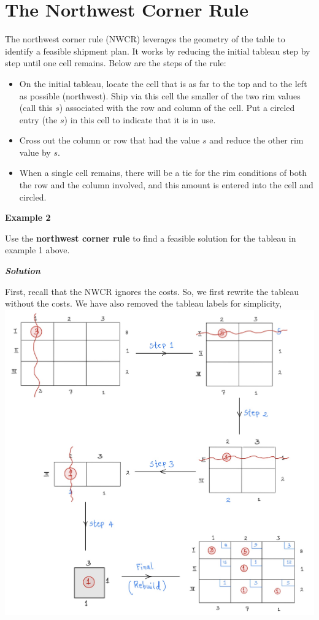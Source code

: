 \documentclass[
  letterpaper,
  DIV=11,
  numbers=noendperiod]{scrreprt}
\providecommand{\tightlist}{%
  \setlength{\itemsep}{0pt}\setlength{\parskip}{0pt}}\usepackage{longtable,booktabs,array}
\begin{document}
\hypertarget{the-northwest-corner-rule}{%
\section{The Northwest Corner Rule}\label{the-northwest-corner-rule}}

The northwest corner rule (NWCR) leverages the geometry of the table to
identify a feasible shipment plan. It works by reducing the initial
tableau step by step until one cell remains. Below are the steps of the
rule:

\begin{itemize}
\tightlist
\item
  On the initial tableau, locate the cell that is as far to the top and
  to the left as possible (northwest). Ship via this cell the smaller of
  the two rim values (call this \(s\)) associated with the row and
  column of the cell. Put a circled entry (the \(s\)) in this cell to
  indicate that it is in use.
\item
  Cross out the column or row that had the value \(s\) and reduce the
  other rim value by \(s\).
\item
  When a single cell remains, there will be a tie for the rim conditions
  of both the row and the column involved, and this amount is entered
  into the cell and circled.
\end{itemize}

\textbf{Example 2}

Use the \textbf{northwest corner rule} to find a feasible solution for
the tableau in example 1 above.

\textbf{\emph{Solution}}

First, recall that the NWCR ignores the costs. So, we first rewrite the
tableau without the costs. We have also removed the tableau labels for
simplicity, \includegraphics{images/l.jpeg}
\end{document}
